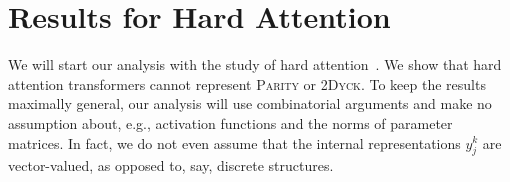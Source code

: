 \documentclass[11pt,a4paper]{article}
\begin{document}






\section{Results for Hard Attention}

We will start our analysis with the study of hard attention~\cite{perez2019turing}.
We show that hard attention transformers cannot represent \textsc{Parity} or \textsc{2Dyck}. %
To keep the results maximally general, our analysis will use combinatorial arguments and make no assumption about, e.g., activation functions and the norms of parameter matrices.
In fact, we do not even assume that the internal representations $y_j^k$ are vector-valued, as opposed to, say, discrete structures.



\end{document}
